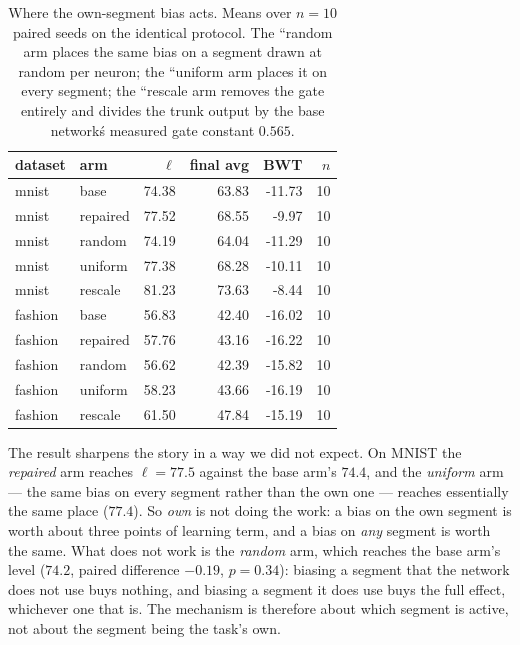 \documentclass[review,12pt,number]{elsarticle}
\begin{document}
\begin{table}[t]
\centering\small
\caption{Where the own-segment bias acts. Means over $n=10$ paired seeds on the identical protocol. The ``random arm places the same bias on a segment drawn at random per neuron; the ``uniform arm places it on every segment; the ``rescale arm removes the gate entirely and divides the trunk output by the base network\'s measured gate constant $0.565$.}
\label{tab:ctrl-specificity}
\begin{tabular}{llrrrr}
\toprule
dataset & arm & $\ell$ & final avg & BWT & $n$ \\
\midrule
mnist & base & 74.38 & 63.83 & -11.73 & 10 \\
mnist & repaired & 77.52 & 68.55 & -9.97 & 10 \\
mnist & random & 74.19 & 64.04 & -11.29 & 10 \\
mnist & uniform & 77.38 & 68.28 & -10.11 & 10 \\
mnist & rescale & 81.23 & 73.63 & -8.44 & 10 \\
fashion & base & 56.83 & 42.40 & -16.02 & 10 \\
fashion & repaired & 57.76 & 43.16 & -16.22 & 10 \\
fashion & random & 56.62 & 42.39 & -15.82 & 10 \\
fashion & uniform & 58.23 & 43.66 & -16.19 & 10 \\
fashion & rescale & 61.50 & 47.84 & -15.19 & 10 \\
\bottomrule
\end{tabular}
\end{table}

The result sharpens the story in a way we did not expect. On MNIST the
\emph{repaired} arm reaches $\ell=77.5$ against the base arm's $74.4$,
and the \emph{uniform} arm --- the same bias on every segment rather
than the own one --- reaches essentially the same place ($77.4$). So
\emph{own} is not doing the work: a bias on the own segment is worth
about three points of learning term, and a bias on \emph{any} segment is
worth the same. What does not work is the \emph{random} arm, which
reaches the base arm's level ($74.2$, paired difference $-0.19$,
$p=0.34$): biasing a segment that the network does not use buys
nothing, and biasing a segment it does use buys the full effect,
whichever one that is. The mechanism is therefore about which segment
is active, not about the segment being the task's own.
\end{document}
